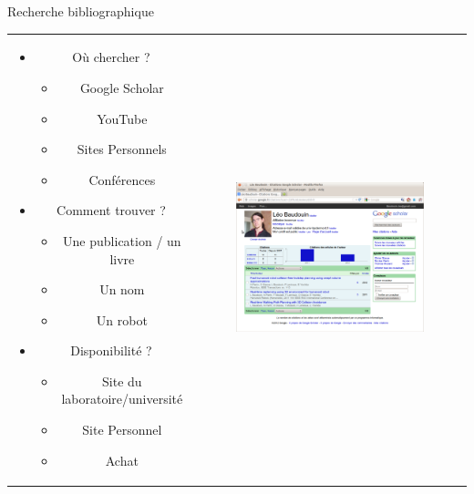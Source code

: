 \documentclass{beamer}
\begin{document}
\begin{frame}{Recherche bibliographique}
  \begin{tabular}{c c}
    \begin{minipage}{0.6\linewidth}
      \begin{itemize}
      \item Où chercher ?
        \begin{itemize}
        \item Google Scholar
        \item YouTube 
        \item Sites Personnels
        \item Conférences
        \end{itemize}
      \item Comment trouver ?
        \begin{itemize}
        \item Une publication / un livre
        \item Un nom
        \item Un robot
        \end{itemize}
      \item Disponibilité ?
        \begin{itemize}
        \item Site du laboratoire/université
        \item Site Personnel
        \item Achat
        \end{itemize}
      \end{itemize}
    \end{minipage}
    &
    \begin{minipage}{0.4\linewidth}
      \begin{figure}
        \includegraphics[width=0.9\linewidth]{images/GoogleScholar.png}

\end{figure}
\end{minipage}
\end{tabular}
\end{frame}
\end{document}
